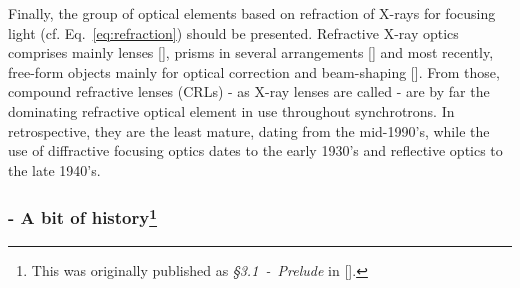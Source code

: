 \begin{refsection}
Finally, the group of optical elements based on refraction of X-rays for focusing light (cf. Eq.~\ref{eq:refraction}) should be presented. Refractive X-ray optics comprises mainly lenses [\cite{Snigirev1996}], prisms in several arrangements [\cite{Cederstrom2000, Jark2004}] and most recently, free-form objects mainly for optical correction and beam-shaping [\cite{Seiboth2017, Zverev2017, Seiboth2019, Seiboth2020}]. From those, compound refractive lenses (CRLs) - as X-ray lenses are called - are by far the dominating refractive optical element in use throughout synchrotrons. In retrospective, they are the least mature, dating from the mid-1990's, while the use of diffractive focusing optics dates to the early 1930's and reflective optics to the late 1940's. 


\subsubsection*{- A bit of history\footnote{This was originally published as \textit{§3.1~-~Prelude} in [\cite{Celestre2017}].}}


\end{refsection}
